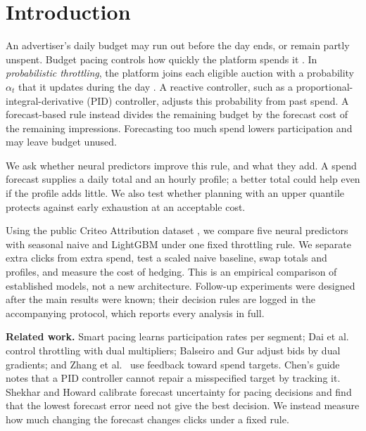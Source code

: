 \documentclass[sigconf,nonacm]{acmart}
\begin{document}


\maketitle

\section{Introduction}

An advertiser's daily budget may run out before the day ends, or remain partly
unspent. Budget pacing controls how quickly the platform spends it
\cite{lee2013real,agarwal2014budget}. In \emph{probabilistic throttling}, the
platform joins each eligible auction with a probability $\alpha_t$ that it
updates during the day \cite{agarwal2014budget,xu2015smart}. A reactive
controller, such as a proportional-integral-derivative (PID) controller,
adjusts this probability from past spend. A forecast-based rule instead
divides the remaining budget by the forecast cost of the remaining
impressions. Forecasting too much spend lowers participation and may leave
budget unused.

We ask whether neural predictors improve this rule, and what they add. A spend
forecast supplies a daily total and an hourly profile; a better total could
help even if the profile adds little. We also test whether planning with an
upper quantile protects against early exhaustion at an acceptable cost.

Using the public Criteo Attribution dataset \cite{diemert2017attribution}, we
compare five neural predictors with seasonal naive and LightGBM under one
fixed throttling rule. We separate extra clicks from extra spend, test a
scaled naive baseline, swap totals and profiles, and measure the cost of
hedging. This is an empirical comparison of established models, not a new
architecture. Follow-up experiments were designed after the main results
were known; their decision rules are logged in the accompanying protocol,
which reports every analysis in full.

\textbf{Related work.} Smart pacing \cite{xu2015smart} learns participation
rates per segment; Dai et al.~\cite{dai2023percentile} control throttling with
dual multipliers; Balseiro and Gur \cite{balseiro2019learning} adjust bids by
dual gradients; and Zhang et al.~\cite{zhang2016feedback} use feedback toward
spend targets. Chen's guide \cite{chen2025practical} notes that a PID
controller cannot repair a misspecified target by tracking it. Shekhar and
Howard \cite{shekhar2026decision} calibrate forecast uncertainty for pacing
decisions and find that the lowest forecast error need not give the best
decision. We instead measure how much changing the forecast changes clicks
under a fixed rule.
\end{document}
